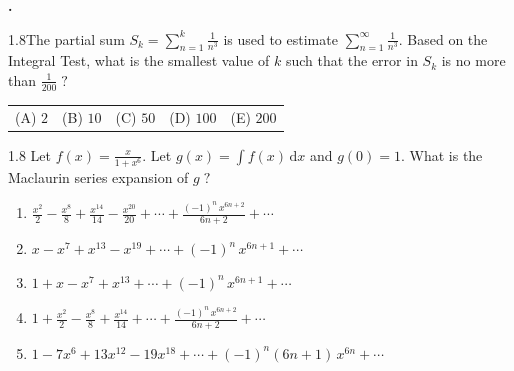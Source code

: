 \documentclass[letterstyle,12pt]{extarticle}
\newcounter{qcounter}
\newcommand{\di}{\, \text{d}}
\newcommand{\choices}[5]{
\vspace{0.8em} 
\begin{enumerate}[label=(\Alph*)]
\setlength\itemsep{1em} 
\item
#1 
\item 
#2
\item
#3
\item
#4
\item
#5
\end{enumerate}
}
\newcommand{\choicesline}[5]{    
\vspace{2em} \break 
\begin{tabularx}{0.95 \textwidth} { 
>{\arraybackslash}X 
>{\arraybackslash}X 
>{\arraybackslash}X 
>{\arraybackslash}X 
>{\arraybackslash}X }
(A) \; #1
& 
(B) \; #2
& 
(C) \; #3
& 
(D) \; #4
&
(E) \; #5 
\end{tabularx}
\vspace{2em} \break
}
\newcommand{\qspace}[1]{\begin{spacing}{1.8}#1\end{spacing}}
\newcommand{\ans}[1]{{\color{black} #1}}
\newenvironment{question}
    {\begin{minipage}{0.9 \textwidth}
        \item
    }
    { 
    \end{minipage} \vspace{4ex}
    }
\begin{document}
\begin{list}{\textbf{.}~}{}
\clearpage 

\begin{question}
\qspace{The partial sum \(S_k = \sum_{n = 1}^k \frac{1}{n^3}\) is used to estimate \(\sum_{n = 1}^\infty \frac{1}{n^3}.\)
Based on the Integral Test, what is the smallest value of \(k\) such that the error in \(S_k\) is no more than \(\frac{1}{200} \; ?\)
} 
\choicesline
{\(2\)}
{\ans{\(10\)}}
{\(50\)}
{\(100\)}
{\(200\)}
\end{question}

\begin{question}
\qspace{
Let \(f(x) = \frac{x}{1 + x^6}.\) Let \(g(x) = \int f(x) \di x\) and \(g(0) = 1.\) What is the Maclaurin series expansion of \(g \; ?\)}
\choices
{\(\frac{x^2}{2} - \frac{x^8}{8} + \frac{x^{14}}{14} - \frac{x^{20}}{20} + \cdots + \frac{(-1)^n \, x^{6n + 2}}{6n + 2} + \cdots\)}
{\(x - x^7 + x^{13} - x^{19} + \cdots + (-1)^n \, x^{6n + 1} + \cdots\)}  
{\(1 + x - x^7 + x^{13} + \cdots + (-1)^n \, x^{6n + 1} + \cdots\)}
{\ans{\(1 + \frac{x^2}{2} - \frac{x^8}{8} + \frac{x^{14}}{14} + \cdots + \frac{(-1)^n \, x^{6n + 2}}{6n + 2} + \cdots\)}} 
{\(1 - 7x^6 + 13x^{12} - 19 x^{18} + \cdots + (-1)^n (6n + 1) \, x^{6n} + \cdots\)}
\end{question}

\end{list}

\clearpage 

\twocolumn
\end{document}
